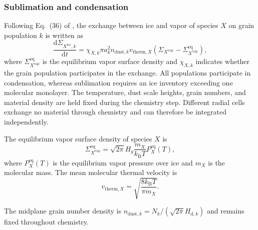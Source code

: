 \subsubsection{Sublimation and condensation}
\label{subsec:sublimation_condensation}

Following Eq.~(36) of \citet{stammlerRedistributionCOLocation2017}, the exchange between
ice and vapor of species $X$ on grain population $k$ is written as
\begin{equation}
    \frac{\mathrm d\Sigma_{X^{\mathrm{ice}},k}}{\mathrm dt}
    =\chi_{X,k}\pi a_k^2 n_{\mathrm{dust},k}v_{\mathrm{therm},X}
    \left(\Sigma_{X^{\mathrm{vap}}}
    -\Sigma_{X^{\mathrm{vap}}}^{\mathrm{eq}}\right),
    \label{eq:simultaneous_phase_rate}
\end{equation}
where $\Sigma_{X^{\mathrm{vap}}}^{\mathrm{eq}}$ is the equilibrium
vapor surface density and $\chi_{X,k}$ indicates whether the grain
population participates in the exchange. All populations participate
in condensation, whereas sublimation requires an ice inventory
exceeding one molecular monolayer. The temperature, dust scale
heights, grain numbers, and material density are held fixed during
the chemistry step. Different radial cells exchange no material
through chemistry and can therefore be integrated independently.

The equilibrium vapor surface density of species $X$ is
\begin{equation}
    \Sigma_{X^{\mathrm{vap}}}^{\mathrm{eq}}
    =
    \sqrt{2\pi}H_g
    \frac{m_X}{k_{\mathrm B}T}P_X^{\mathrm{eq}}(T),
    \label{eq:sigma_vap_eq}
\end{equation}
where $P_X^{\mathrm{eq}}(T)$ is the equilibrium vapor pressure over ice
and $m_X$ is the molecular mass. The mean molecular thermal velocity is
\begin{equation}
    v_{\mathrm{therm},X}
    =\sqrt{\frac{8k_{\mathrm B}T}{\pi m_X}}.
\end{equation}

The midplane grain number density is
$n_{\mathrm{dust},k}=N_k/(\sqrt{2\pi}H_{\mathrm d,k})$
and remains fixed throughout chemistry.

